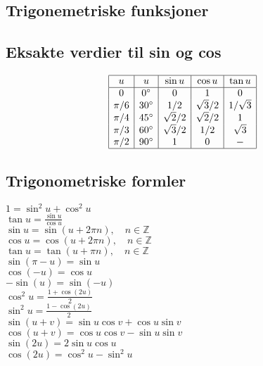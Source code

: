\documentclass[a4paper,7pt,fleqn]{article}
\begin{document}
\newpage
\begin{multicols}{2}
\section{Trigonemetriske funksjoner}

\subsection*{Eksakte verdier til sin og cos}

\[
\begin{array}{|c|c|c|c|c|}
\hline
u & u & \sin u & \cos u & \tan u \\
\hline
0 & 0^\circ & 0 & 1 & 0 \\
\pi/6 & 30^\circ & 1/2 & \sqrt{3}/2 & 1/\sqrt{3} \\
\pi/4 & 45^\circ & \sqrt{2}/2 & \sqrt{2}/2 & 1 \\
\pi/3 & 60^\circ & \sqrt{3}/2 & 1/2 & \sqrt{3} \\
\pi/2 & 90^\circ & 1 & 0 & - \\
\hline
\end{array}
\]

\begin{minipage}{\linewidth}
\subsection{Trigonometriske formler}
\(1 = \sin^2 u + \cos^2 u\) \\
\(\tan u = \frac{\sin u}{\cos u}\) \\
\(\sin u = \sin(u + 2\pi n), \quad n \in \mathbb{Z}\) \\
\(\cos u = \cos(u + 2\pi n), \quad n \in \mathbb{Z}\) \\
\(\tan u = \tan(u + \pi n), \quad n \in \mathbb{Z}\) \\
\(\sin(\pi - u) = \sin u\) \\
\(\cos(-u) = \cos u\) \\
\(-\sin(u) = \sin(-u)\) \\
\(\cos^2 u = \frac{1 + \cos(2u)}{2}\) \\
\(\sin^2 u = \frac{1 - \cos(2u)}{2}\) \\
\(\sin(u + v) = \sin u \cos v + \cos u \sin v\) \\
\(\cos(u + v) = \cos u \cos v - \sin u \sin v\) \\
\(\sin(2u) = 2 \sin u \cos u\) \\
\(\cos(2u) = \cos^2 u - \sin^2 u\)
\end{minipage}
\end{multicols}
\end{document}
